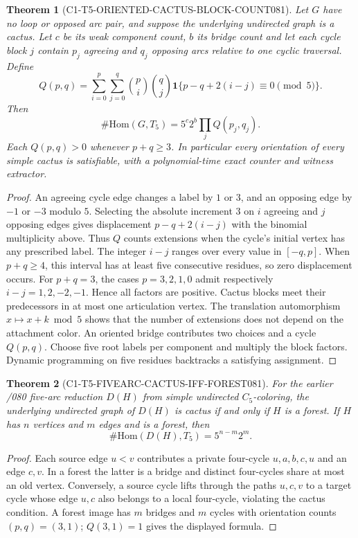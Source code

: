 \documentclass[11pt]{article}
\newtheorem{theorem}{Theorem}
\begin{document}
\begin{theorem}[C1-T5-ORIENTED-CACTUS-BLOCK-COUNT081]
Let $G$ have no loop or opposed arc pair, and suppose the
underlying undirected graph is a cactus. Let $c$ be its
weak component count, $b$ its bridge count and let
each cycle block $j$ contain $p_j$ agreeing and $q_j$
opposing arcs relative to one cyclic traversal. Define
\[
 Q(p,q)=\sum_{i=0}^{p}\sum_{j=0}^{q}
 \binom pi\binom qj
 {\mathbf 1}\{p-q+2(i-j)\equiv0\pmod5\}.
\]
Then
\[
 \#\mathrm{Hom}(G,T_5)=5^c2^b\prod_jQ(p_j,q_j).
\]
Each $Q(p,q)>0$ whenever $p+q\ge3$.
In particular every orientation of every simple cactus
is satisfiable, with a polynomial-time exact counter
and witness extractor.
\end{theorem}
\begin{proof}
An agreeing cycle edge changes a label by $1$ or $3$,
and an opposing edge by $-1$ or $-3$ modulo $5$.
Selecting the absolute increment $3$ on $i$ agreeing
and $j$ opposing edges gives displacement
$p-q+2(i-j)$ with the binomial multiplicity above.
Thus $Q$ counts extensions when the cycle's initial
vertex has any prescribed label. The integer $i-j$
ranges over every value in $[-q,p]$. When $p+q\ge4$,
this interval has at least five consecutive residues,
so zero displacement occurs. For $p+q=3$, the
cases $p=3,2,1,0$ admit respectively
$i-j=1,2,-2,-1$. Hence all factors are positive.
Cactus blocks meet their predecessors in at most
one articulation vertex. The translation automorphism
$x\mapsto x+k\bmod5$ shows that the number of
extensions does not depend on the attachment color.
An oriented bridge contributes two choices and
a cycle $Q(p,q)$. Choose five root labels per
component and multiply the block factors.
Dynamic programming on five residues backtracks
a satisfying assignment.
\end{proof}
\begin{theorem}[C1-T5-FIVEARC-CACTUS-IFF-FOREST081]
For the earlier /080 five-arc reduction $D(H)$ from
simple undirected $C_5$-coloring, the underlying
undirected graph of $D(H)$ is cactus if and only if
$H$ is a forest. If $H$ has $n$ vertices and $m$
edges and is a forest, then
\[
 \#\mathrm{Hom}(D(H),T_5)=5^{n-m}2^m.
\]
\end{theorem}
\begin{proof}
Each source edge $u<v$ contributes a private
four-cycle $u,a,b,c,u$ and an edge $c,v$.
In a forest the latter is a bridge and distinct
four-cycles share at most an old vertex.
Conversely, a source cycle lifts through the paths
$u,c,v$ to a target cycle whose edge $u,c$ also
belongs to a local four-cycle, violating the cactus
condition. A forest image has $m$ bridges and $m$
cycles with orientation counts $(p,q)=(3,1)$;
$Q(3,1)=1$ gives the displayed formula.
\end{proof}
\end{document}
